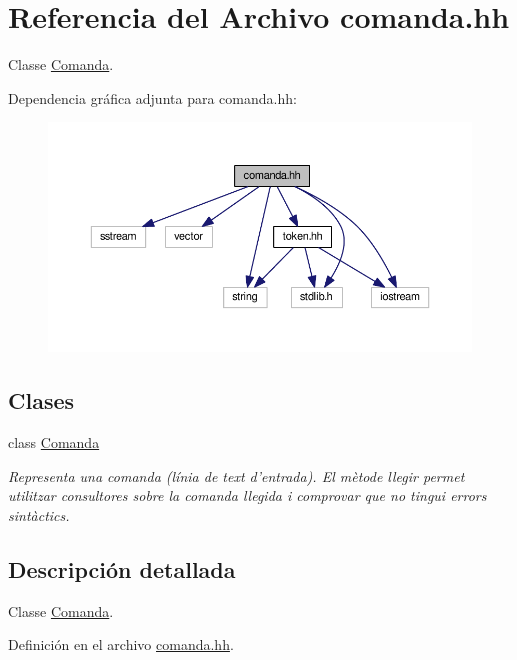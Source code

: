 \hypertarget{comanda_8hh}{\section{Referencia del Archivo comanda.\-hh}
\label{comanda_8hh}
}


Classe \hyperlink{class_comanda}{Comanda}.  


Dependencia gráfica adjunta para comanda.\-hh\-:
\nopagebreak
\begin{figure}[H]
\begin{center}
\leavevmode
\includegraphics[width=350pt]{comanda_8hh__incl}
\end{center}
\end{figure}
\subsection*{Clases}
\begin{DoxyCompactItemize}
\item 
class \hyperlink{class_comanda}{Comanda}
\begin{DoxyCompactList}\small\item\em Representa una comanda (línia de text d'entrada). El mètode llegir permet utilitzar consultores sobre la comanda llegida i comprovar que no tingui errors sintàctics. \end{DoxyCompactList}\end{DoxyCompactItemize}


\subsection{Descripción detallada}
Classe \hyperlink{class_comanda}{Comanda}. 

Definición en el archivo \hyperlink{comanda_8hh_source}{comanda.\-hh}.

